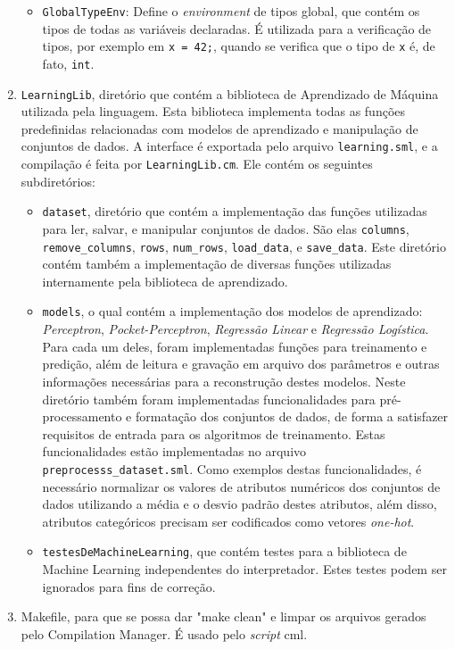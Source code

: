 \documentclass[12pt]{article}
\begin{document}
\begin{enumerate}
\begin{itemize}
\item \texttt{GlobalTypeEnv}: Define o \textit{environment} de tipos global, que contém os tipos de todas as variáveis declaradas. É utilizada para a verificação de tipos, por exemplo em \texttt{x = 42;}, quando se verifica que o tipo de \texttt{x} é, de fato, \texttt{int}.
\end{itemize}
\item \texttt{LearningLib}, diretório que contém a biblioteca de Aprendizado de Máquina utilizada pela linguagem. Esta biblioteca implementa todas as funções predefinidas relacionadas com modelos de aprendizado e manipulação de conjuntos de dados. A interface é exportada pelo arquivo \texttt{learning.sml}, e a compilação é feita por \texttt{LearningLib.cm}. Ele contém os seguintes subdiretórios:

\begin{itemize} \item \texttt{dataset}, diretório que contém a implementação das funções utilizadas para ler, salvar, e manipular conjuntos de dados. São elas \texttt{columns}, \texttt{remove\_columns}, \texttt{rows}, \texttt{num\_rows}, \texttt{load\_data}, e \texttt{save\_data}. Este diretório contém também a implementação de diversas funções utilizadas internamente pela biblioteca de aprendizado.

\item \texttt{models}, o qual contém a implementação dos modelos de aprendizado: \textit{Perceptron}, \textit{Pocket-Perceptron}, \textit{Regressão Linear} e \textit{Regressão Logística}. Para cada um deles, foram implementadas funções para treinamento e predição, além de leitura e gravação em arquivo dos parâmetros e outras informações necessárias para a reconstrução destes modelos. Neste diretório também foram implementadas funcionalidades para pré-processamento e formatação dos conjuntos de dados, de forma a satisfazer requisitos de entrada para os algoritmos de treinamento. Estas funcionalidades estão implementadas no arquivo \texttt{preprocesss\_dataset.sml}. Como exemplos destas funcionalidades, é necessário normalizar os valores de atributos numéricos dos conjuntos de dados utilizando a média e o desvio padrão destes atributos, além disso, atributos categóricos precisam ser codificados como vetores \textit{one-hot}.

\item \texttt{testesDeMachineLearning}, que contém testes para a biblioteca de Machine Learning independentes do interpretador. Estes testes podem ser ignorados para fins de correção.
\end{itemize}

\item Makefile, para que se possa dar "make clean" e limpar os arquivos gerados pelo Compilation Manager. É usado pelo \textit{script} cml.
\end{enumerate}
\end{document}
